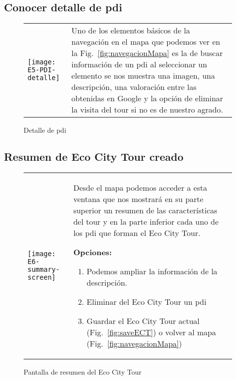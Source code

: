 \subsection{Conocer detalle de \acrshort{pdi}}
\begin{figure}[H]
	\centering
	\begin{tabular}{m{} m{}}
		\texttt{[image: E5-PDI-detalle]} & 
		\vspace{-10pt}
		Uno de los elementos básicos de la navegación en el mapa que podemos ver en la Fig.~\ref{fig:navegacionMapa} es la de buscar información de un \acrlong{pdi} al seleccionar un elemento se nos muestra una imagen, una descripción, una valoración entre las obtenidas en Google y la opción de eliminar la visita del tour si no es de nuestro agrado. 
	\end{tabular}
	\caption{Detalle de \acrshort{pdi}}
	\label{fig:detallePDI}
\end{figure}

\subsection{Resumen de Eco City Tour creado}
\begin{figure}[H]
	\centering
	\begin{tabular}{m{} m{}}
		\texttt{[image: E6-summary-screen]} & 
		\vspace{-10pt}
		Desde el mapa podemos acceder a esta ventana que nos mostrará en su parte superior un resumen de las características del tour y en la parte inferior cada uno de los \acrlong{pdi} que forman el Eco City Tour.
		
		\textbf{Opciones:}
		\begin{enumerate}
			\item Podemos ampliar la información de la descripción.
			\item Eliminar del Eco City Tour un \acrshort{pdi}
			\item Guardar el Eco City Tour actual (Fig.~\ref{fig:saveECT}) o volver al mapa (Fig.~\ref{fig:navegacionMapa})
		\end{enumerate}		
	\end{tabular}
	\caption{Pantalla de resumen del Eco City Tour}
	\label{fig:resumenECT}
\end{figure}

